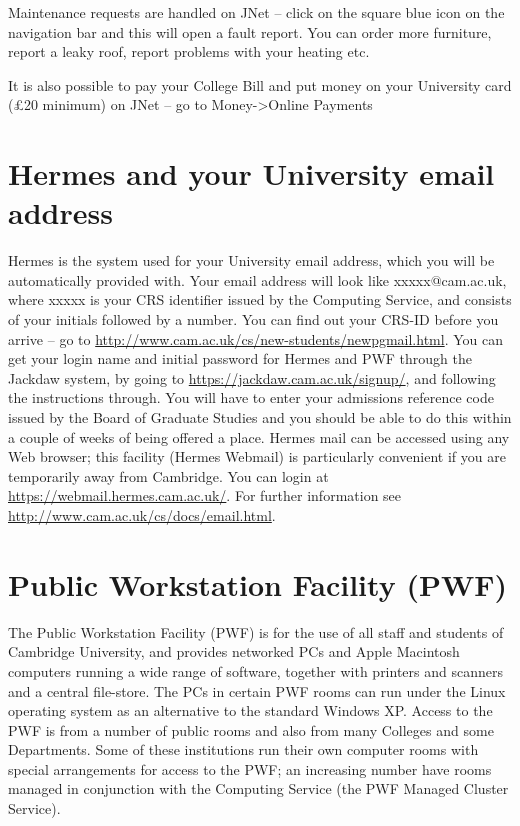 \documentclass[11pt,fleqn, oneside]{book} %
\begin{document}
Maintenance requests are handled on JNet – click on the square blue icon on the navigation bar and this will open a fault report.  You can order more furniture, report a leaky roof, report problems with your heating etc.  
 
It is also possible to pay your College Bill and put money on your University card (\pounds{20} minimum) on JNet – go to Money->Online Payments
   
\section{Hermes and your University email address}
   
Hermes is the system used for your University email address, which you will be automatically provided with.  Your email address will look like xxxxx@cam.ac.uk, where xxxxx is your CRS identifier issued by the Computing Service, and consists of your initials followed by a number.  You can find out your CRS-ID before you arrive – go to \url{http://www.cam.ac.uk/cs/new-students/newpgmail.html}. 
You can get your login name and initial password for Hermes and PWF through the Jackdaw system, by going to \url{https://jackdaw.cam.ac.uk/signup/}, and following the instructions through.  You will have to enter your admissions reference code issued by the Board of Graduate Studies and you should be able to do this within a couple of weeks of being offered a place.
Hermes mail can be accessed using any Web browser; this facility (Hermes Webmail) is particularly convenient if you are temporarily away from Cambridge.  You can login at \url{https://webmail.hermes.cam.ac.uk/}.  For further information see \url{http://www.cam.ac.uk/cs/docs/email.html}. 
   
\section{Public Workstation Facility (PWF)}
   
The Public Workstation Facility (PWF) is for the use of all staff and students of Cambridge University, and provides networked PCs and Apple Macintosh computers running a wide range of software, together with printers and scanners and a central file-store. The PCs in certain PWF rooms can run under the Linux operating system as an alternative to the standard Windows XP. 
Access to the PWF is from a number of public rooms and also from many Colleges and some Departments. Some of these institutions run their own computer rooms with special arrangements for access to the PWF; an increasing number have rooms managed in conjunction with the Computing Service (the PWF Managed Cluster Service).
   
\end{document}

